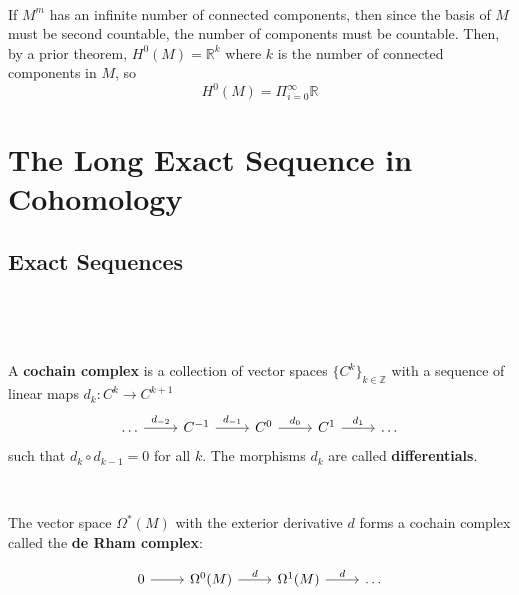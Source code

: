 \documentclass{article}
\begin{document}
\begin{solution}
  \

  If $M^m$ has an infinite number of connected components, then since the basis of $M$ must be second countable, the number of components must be countable. Then, by a prior theorem, $H^0(M) = \mathbb{R}^k$ where $k$ is the number of connected components in $M$, so $$H^0(M) = \Pi_{i=0}^\infty \mathbb{R}$$
\end{solution}

\section{The Long Exact Sequence in Cohomology}

\subsection{Exact Sequences}
\

\begin{definition}
  \

  A \textbf{cochain complex} is a collection of vector spaces $\{C^k\}_{k \in \mathbb{Z}}$ with a sequence of linear maps $d_k: C^k \to C^{k+1}$ \[
    \begin{tikzcd}
      \dots & C^{-1} & C^0 & C^1 & \dots
      \arrow[from=1-1, to=1-2, "d_{-2}"]
      \arrow[from=1-2, to=1-3, "d_{-1}"]
      \arrow[from=1-3, to=1-4, "d_0"]
      \arrow[from=1-4, to=1-5, "d_1"]
  \end{tikzcd} \]such that $d_k \circ d_{k-1} = 0$ for all $k$. The morphisms $d_k$ are called \textbf{differentials}.
\end{definition}

\begin{example}
  \

  The vector space $\Omega^*(M)$ with the exterior derivative $d$ forms a cochain complex called the \textbf{de Rham complex}:

  \[
    \begin{tikzcd}
      0 & \Omega^0(M) & \Omega^1(M) & \dots
      \arrow[from=1-1, to=1-2]
      \arrow[from=1-2, to=1-3, "d"]
      \arrow[from=1-3, to=1-4, "d"]
  \end{tikzcd}\]
\end{example}
\end{document}
